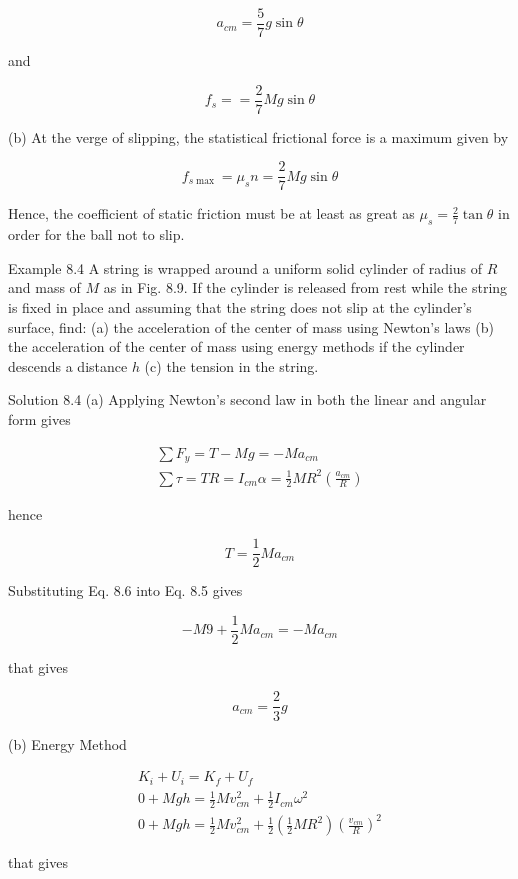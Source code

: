 \documentclass[10pt]{article}
\begin{document}
$$
a_{c m}=\frac{5}{7} g \sin \theta
$$

and

$$
f_{s}==\frac{2}{7} M g \sin \theta
$$

(b) At the verge of slipping, the statistical frictional force is a maximum given by

$$
f_{s \max }=\mu_{s} n=\frac{2}{7} M g \sin \theta
$$

Hence, the coefficient of static friction must be at least as great as $\mu_{s}=\frac{2}{7} \tan \theta$ in order for the ball not to slip.

Example 8.4 A string is wrapped around a uniform solid cylinder of radius of $R$ and mass of $M$ as in Fig. 8.9. If the cylinder is released from rest while the string is fixed in place and assuming that the string does not slip at the cylinder's surface, find: (a) the acceleration of the center of mass using Newton's laws (b) the acceleration of the center of mass using energy methods if the cylinder descends a distance $h$ (c) the tension in the string.

Solution 8.4 (a) Applying Newton's second law in both the linear and angular form gives


\begin{gather*}
\sum F_{y}=T-M g=-M a_{c m}  \tag{8.5}\\
\sum \tau=T R=I_{c m} \alpha=\frac{1}{2} M R^{2}\left(\frac{a_{c m}}{R}\right)
\end{gather*}


hence


\begin{equation*}
T=\frac{1}{2} M a_{c m} \tag{8.6}
\end{equation*}


Substituting Eq. 8.6 into Eq. 8.5 gives

$$
-M 9+\frac{1}{2} M a_{c m}=-M a_{c m}
$$

that gives

$$
a_{c m}=\frac{2}{3} g
$$

(b) Energy Method

$$
\begin{gathered}
K_{i}+U_{i}=K_{f}+U_{f} \\
0+M g h=\frac{1}{2} M v_{c m}^{2}+\frac{1}{2} I_{c m} \omega^{2} \\
0+M g h=\frac{1}{2} M v_{c m}^{2}+\frac{1}{2}\left(\frac{1}{2} M R^{2}\right)\left(\frac{v_{c m}}{R}\right)^{2}
\end{gathered}
$$

that gives
\end{document}

